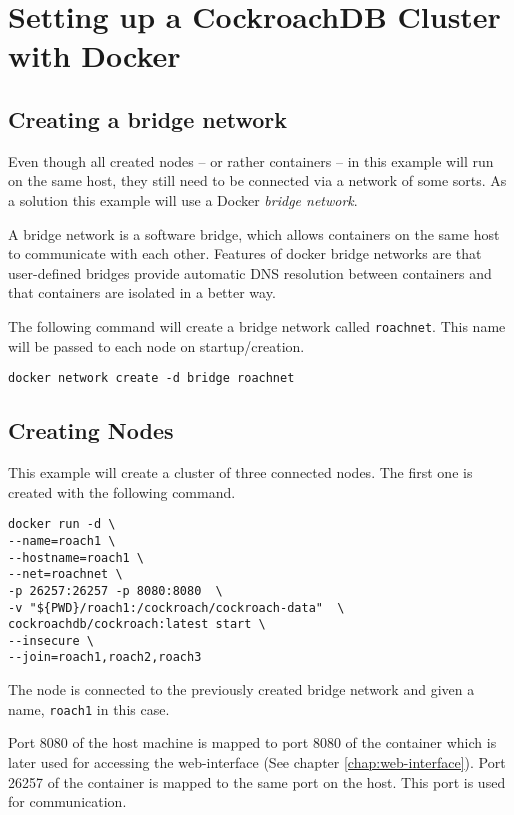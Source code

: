 \section{Setting up a CockroachDB Cluster with Docker}

\subsection{Creating a bridge network}
Even though all created nodes -- or rather containers -- in this example will run on the same host, they still need to be connected via a network of some sorts. As a solution this example will use a Docker \emph{bridge network}.

A bridge network is a software bridge, which allows containers on the same host to communicate with each other. Features of docker bridge networks are that user-defined bridges provide automatic DNS resolution between containers and that containers are isolated in a better way.\cite{docker-bridge}

\medskip
The following command will create a bridge network called \verb|roachnet|. This name will be passed to each node on startup/creation.

\begin{verbatim}
docker network create -d bridge roachnet
\end{verbatim}

\subsection{Creating Nodes}

This example will create a cluster of three connected nodes. The first one is created with the following command.

\begin{verbatim}
docker run -d \
--name=roach1 \
--hostname=roach1 \
--net=roachnet \
-p 26257:26257 -p 8080:8080  \
-v "${PWD}/roach1:/cockroach/cockroach-data"  \
cockroachdb/cockroach:latest start \
--insecure \
--join=roach1,roach2,roach3
\end{verbatim}

The node is connected to the previously created bridge network and given a name, \verb|roach1| in this case.

\medskip
Port 8080 of the host machine is mapped to port 8080 of the container which is later used for accessing the web-interface (See chapter \ref{chap:web-interface}).
Port 26257 of the container is mapped to the same port on the host. This port is used for communication.

